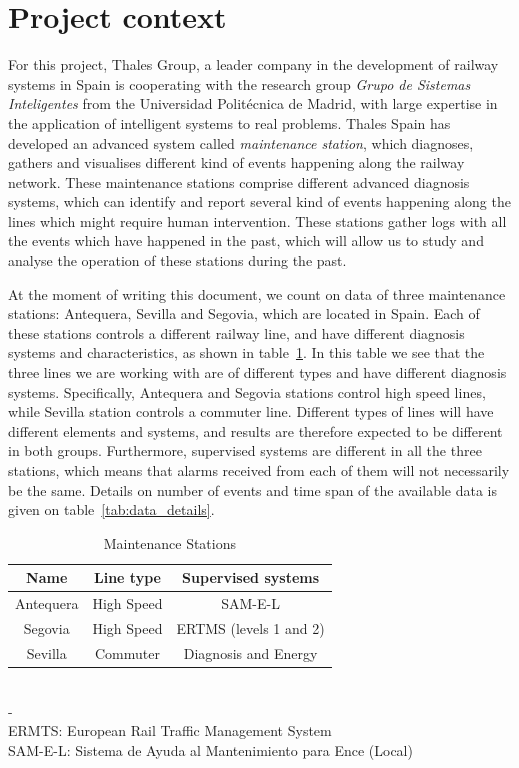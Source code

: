 \documentclass[a4paper,12pt]{article}
\begin{document}
\section{Project context}
For this project, Thales Group, a leader company in the development of railway systems in Spain is cooperating with the research group {\it Grupo de Sistemas Inteligentes} from the Universidad Politécnica de Madrid, with large expertise in the application of intelligent systems to real problems. Thales Spain has developed an advanced system called \emph{maintenance station}, which diagnoses, gathers and visualises different kind of events happening along the railway network. These maintenance stations comprise different advanced diagnosis systems, which can identify and report several kind of events happening along the lines which might require human intervention. These stations gather logs with all the events which have happened in the past, which will allow us to study and analyse the operation of these stations during the past.

At the moment of writing this document, we count on data of three maintenance stations: Antequera, Sevilla and Segovia, which are located in Spain. Each of these stations controls a different railway line, and have different diagnosis systems and characteristics, as shown in table~\ref{tab:stations}. In this table we see that the three lines we are working with are of different types and have different diagnosis systems. Specifically, Antequera and Segovia stations control high speed lines, while Sevilla station controls a commuter line. Different types of lines will have different elements and systems, and results are therefore expected to be different in both groups. Furthermore, supervised systems are different in all the three stations, which means that alarms received from each of them will not necessarily be the same. Details on number of events and time span of the available data is given on table~\ref{tab:data_details}.

\begin{table}
\begin{center}
\begin{tabular}{|c|c|c|}
\hline Name & Line type & Supervised systems \\ 
\hline Antequera & High Speed & SAM-E-L \\ 
\hline Segovia & High Speed & ERTMS (levels 1 and 2) \\ 
\hline Sevilla & Commuter & Diagnosis and Energy \\ 
\hline 
\end{tabular}
\\
-\\
ERMTS: European Rail Traffic Management System\\
SAM-E-L: Sistema de Ayuda al Mantenimiento para Ence (Local)\\

\end{center} 
\caption {Maintenance Stations} \label{tab:stations} 
\end{table}
\end{document}
